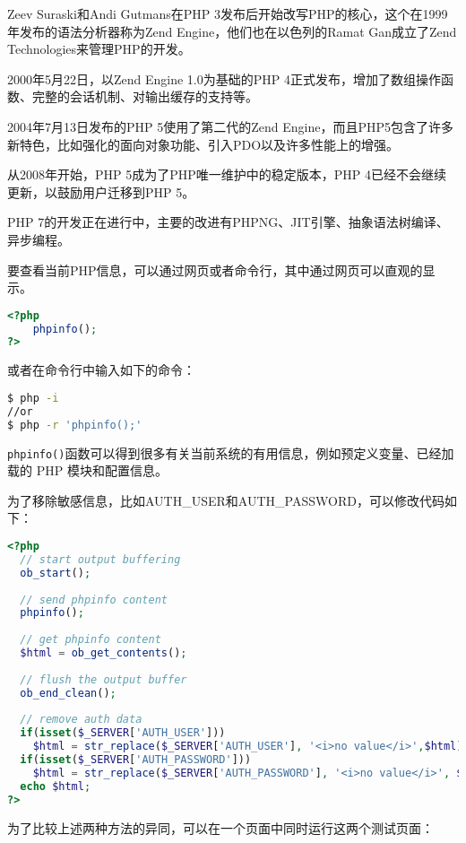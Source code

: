 Zeev Suraski和Andi Gutmans在PHP 3发布后开始改写PHP的核心，这个在1999年发布的语法分析器称为Zend Engine，他们也在以色列的Ramat Gan成立了Zend Technologies来管理PHP的开发。

2000年5月22日，以Zend Engine 1.0为基础的PHP 4正式发布，增加了数组操作函数、完整的会话机制、对输出缓存的支持等。

2004年7月13日发布的PHP 5使用了第二代的Zend Engine，而且PHP5包含了许多新特色，比如强化的面向对象功能、引入PDO以及许多性能上的增强。



从2008年开始，PHP 5成为了PHP唯一维护中的稳定版本，PHP 4已经不会继续更新，以鼓励用户迁移到PHP 5。

PHP 7的开发正在进行中，主要的改进有PHPNG、JIT引擎、抽象语法树编译、异步编程。





要查看当前PHP信息，可以通过网页或者命令行，其中通过网页可以直观的显示。

\begin{lstlisting}[language=PHP]
<?php
	phpinfo();
?>
\end{lstlisting}

或者在命令行中输入如下的命令：

\begin{lstlisting}[language=bash]
$ php -i
//or
$ php -r 'phpinfo();'
\end{lstlisting}

\texttt{phpinfo()}函数可以得到很多有关当前系统的有用信息，例如预定义变量、已经加载的 PHP 模块和配置信息。

为了移除敏感信息，比如AUTH\_USER和AUTH\_PASSWORD，可以修改代码如下：

\begin{lstlisting}[language=PHP]
<?php
  // start output buffering
  ob_start();
  
  // send phpinfo content
  phpinfo();
  
  // get phpinfo content
  $html = ob_get_contents();
  
  // flush the output buffer
  ob_end_clean();
  
  // remove auth data
  if(isset($_SERVER['AUTH_USER']))
    $html = str_replace($_SERVER['AUTH_USER'], '<i>no value</i>',$html);
  if(isset($_SERVER['AUTH_PASSWORD']))
    $html = str_replace($_SERVER['AUTH_PASSWORD'], '<i>no value</i>', $html);
  echo $html;
?>
\end{lstlisting}

为了比较上述两种方法的异同，可以在一个页面中同时运行这两个测试页面：

